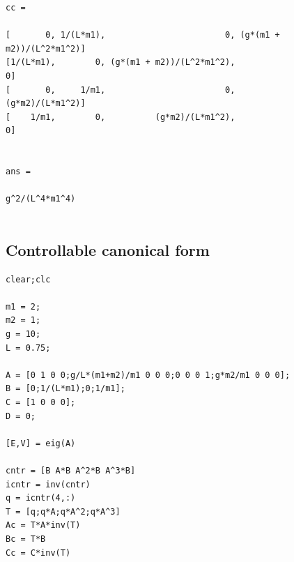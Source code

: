 \documentclass[12pt]{article}
\numberwithin{equation}{section}
\begin{document}
        \color{lightgray} \begin{verbatim} 
cc =
 
[       0, 1/(L*m1),                        0, (g*(m1 + m2))/(L^2*m1^2)]
[1/(L*m1),        0, (g*(m1 + m2))/(L^2*m1^2),                        0]
[       0,     1/m1,                        0,          (g*m2)/(L*m1^2)]
[    1/m1,        0,          (g*m2)/(L*m1^2),                        0]
 
 
ans =
 
g^2/(L^4*m1^4)
 
\end{verbatim} \color{black}

\subsection{Controllable canonical form}
\label{app:ccf}
    \begin{verbatim}
clear;clc

m1 = 2;
m2 = 1;
g = 10;
L = 0.75;

A = [0 1 0 0;g/L*(m1+m2)/m1 0 0 0;0 0 0 1;g*m2/m1 0 0 0];
B = [0;1/(L*m1);0;1/m1];
C = [1 0 0 0];
D = 0;

[E,V] = eig(A)

cntr = [B A*B A^2*B A^3*B]
icntr = inv(cntr)
q = icntr(4,:)
T = [q;q*A;q*A^2;q*A^3]
Ac = T*A*inv(T)
Bc = T*B
Cc = C*inv(T)
\end{verbatim}
\end{document}
